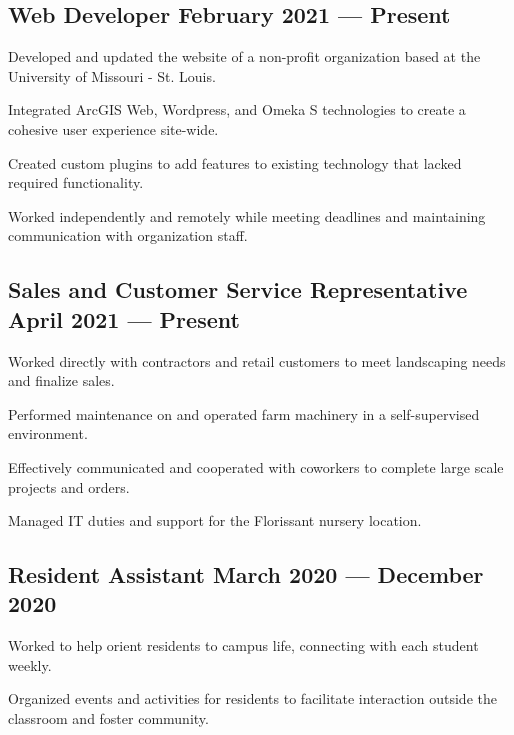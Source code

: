 
\subsection{{Web Developer \hfill February 2021 --- Present}}
\begin{zitemize}
\item Developed and updated the website of a non-profit organization based at the University of Missouri - St. Louis.
\item Integrated ArcGIS Web, Wordpress, and Omeka S technologies to create a cohesive user experience site-wide.
\item Created custom plugins to add features to existing technology that lacked required functionality.
\item Worked independently and remotely while meeting deadlines and maintaining communication with organization staff.
\end{zitemize}

\subsection{{Sales and Customer Service Representative  \hfill April 2021 --- Present}}
\begin{zitemize}  
\item Worked directly with contractors and retail customers to meet landscaping needs and finalize sales.
\item Performed maintenance on and operated farm machinery in a self-supervised environment.
\item Effectively communicated and cooperated with coworkers to complete large scale projects and orders.
\item Managed IT duties and support for the Florissant nursery location.
\end{zitemize}


\subsection{{Resident Assistant \hfill March 2020 --- December 2020}}
\begin{zitemize}
\item Worked to help orient residents to campus life, connecting with each student weekly.
\item Organized events and activities for residents to facilitate interaction outside the classroom and foster community.
\end{zitemize}


